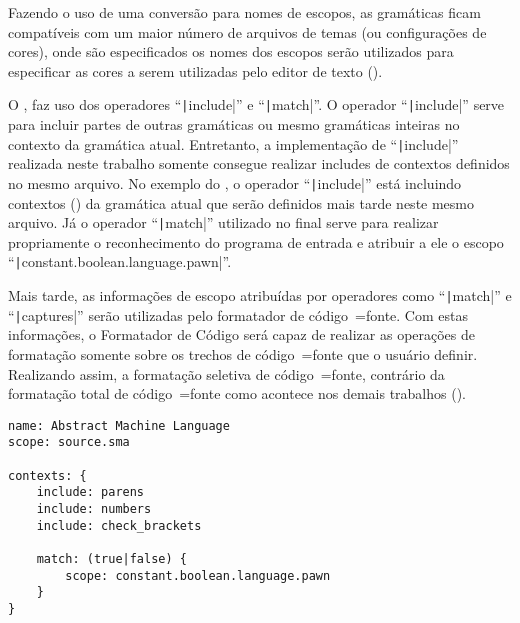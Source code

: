 Fazendo o uso de uma conversão para nomes de escopos,
as gramáticas ficam compatíveis com um maior número de arquivos de temas (ou configurações de cores),
onde são especificados os nomes dos escopos serão utilizados para especificar as cores a serem utilizadas pelo editor de texto ().

O ,
faz uso dos operadores ``\texttt|include|'' e
``\texttt|match|''.
O operador ``\texttt|include|'' serve para incluir partes de outras gramáticas ou
mesmo gramáticas inteiras no contexto da gramática atual.
Entretanto,
a implementação de ``\texttt|include|'' realizada neste trabalho somente consegue realizar includes de contextos definidos no mesmo arquivo.
No exemplo do ,
o operador ``\texttt|include|'' está incluindo contextos () da gramática atual que serão definidos mais tarde neste mesmo arquivo.
Já o operador ``\texttt|match|'' utilizado no final serve para realizar propriamente o reconhecimento do programa de entrada e
atribuir a ele o escopo ``\texttt|constant.boolean.language.pawn|''.

Mais tarde,
as informações de escopo atribuídas por operadores como ``\texttt|match|'' e
``\texttt|captures|'' serão utilizadas pelo formatador de código~=fonte.
Com estas informações,
o Formatador de Código será capaz de realizar as operações de formatação somente sobre os trechos de código~=fonte que o usuário definir.
Realizando assim,
a formatação seletiva de código~=fonte,
contrário da formatação total de código~=fonte como acontece nos demais trabalhos ().
\begin{lstlisting}[caption={Exemplo de Gramática, Símbolo Inicial},label={code:exemploDeGramaticaPawn1},style=yaml_style]
name: Abstract Machine Language
scope: source.sma

contexts: {
    include: parens
    include: numbers
    include: check_brackets

    match: (true|false) {
        scope: constant.boolean.language.pawn
    }
}
\end{lstlisting}

